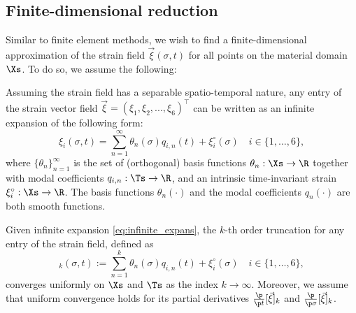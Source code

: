 \subsection{Finite-dimensional reduction}
Similar to finite element methods, we wish to find a finite-dimensional approximation of the strain field $\vec{\xi}(\sigma,t)$ for all points on the material domain $\Xs$. To do so, we assume the following:
%
\begin{asm}
\vspace{1mm}
Assuming the strain field has a separable spatio-temporal nature, any entry of the strain vector field $\vec{\xi} = \left( \xi_1, \xi_2, ..., \xi_6 \right)^\top$ can be written as an infinite expansion of the following form:
%
\begin{equation}
\xi_i(\sigma,t) = \sum_{n=1}^\infty \theta_{n}(\sigma)q_{i,n}(t) + \xi^\circ_{i}(\sigma) \quad i\in\{1,\hdots,6\},
\label{eq:infinite_expans}
\end{equation}
%
where $\{\theta_{n}\}^\infty_{n=1}$ is the set of (orthogonal) basis functions $\theta_{n}: \Xs \to \R$ together with modal coefficients $q_{i,n}: \Ts \to \R$, and an intrinsic time-invariant strain $\xi^\circ_{i}: \Xs \to \R$. The basis functions $\theta_{n}(\cdot)$ and the modal coefficients $q_n(\cdot)$ are both smooth functions.
\end{asm}

\begin{asm}
Given infinite expansion \eqref{eq:infinite_expans}, the $k$-th order truncation for any entry of the strain field, defined as
%
\begin{equation}
[\xi_i]_k(\sigma,t) := \sum_{n=1}^k \theta_n(\sigma)q_{i,n}(t) + \xi^\circ_{i}(\sigma) \quad i\in\{1,\hdots,6\},
\end{equation}
%
converges uniformly on $\Xs$ and $\Ts$ as the index $k \to \infty$. Moreover, we assume that uniform convergence holds for its partial derivatives $\tfrac{\p}{\p t} [\vec{\xi}]_k$ and $\tfrac{\p}{\p \sigma} [\vec{\xi}]_k$.
\end{asm}


